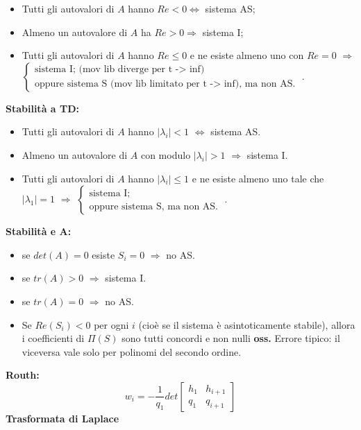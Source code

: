 \begin{landscape}
\begin{multicols*}{3}
\begin{itemize}
    \item Tutti gli autovalori di $A$ hanno $Re < 0 \Longleftrightarrow $ sistema AS;
    \item Almeno un autovalore di $A$ ha $Re > 0 \Longrightarrow$ sistema I;
    \item Tutti gli autovalori di $A$ hanno $Re \leq 0$ e ne esiste almeno uno con $Re = 0$ $\Longrightarrow$ $\begin{cases}
        \text{sistema I; (mov lib diverge per t -> inf)}\;\\
        \text{oppure sistema S (mov lib limitato per t -> inf), ma non AS.}\;
    \end{cases}$.
\end{itemize}
\textbf{Stabilità a TD:}
\begin{itemize}
    \item Tutti gli autovalori di $A$ hanno $|\lambda_i| < 1$ $\Longleftrightarrow$ sistema AS.
    \item Almeno un autovalore di $A$ con modulo $|\lambda_i| > 1$ $\Longrightarrow$ sistema I.
    \item Tutti gli autovalori di $A$ hanno $|\lambda_i| \leq 1$ e ne esiste almeno uno tale che $|\lambda_1| = 1$ $\Longrightarrow$ $\begin{cases}
        \text{sistema I;}\;\\
        \text{oppure sistema S, ma non AS.}\;
    \end{cases}$.
\end{itemize}
\textbf{Stabilità e A:}
\begin{itemize}
    \item se $det(A) = 0$ esiste $S_i = 0$ $\Longrightarrow$ no AS.
    \item se $tr(A) >0$ $\Longrightarrow$ sistema I.
    \item se $tr(A) = 0$ $\Longrightarrow$ no AS.
    \item Se $Re(S_i)<0$ per ogni $i$ (cioè se il sistema è asintoticamente stabile), allora i coefficienti di $\Pi(S)$ sono tutti concordi e non nulli \newline
    \textbf{oss.} Errore tipico: il viceversa vale solo per polinomi del secondo ordine.
\end{itemize}
\textbf{Routh:}
\[
    w_i = - \frac{1}{q_1} det\left[\begin{matrix}
        h_1 & h_{i+1} \\
        q_1 & q_{i+1}
    \end{matrix}\right]
\]
\textbf{Trasformata di Laplace}\newline

\end{multicols*}
\end{landscape}
